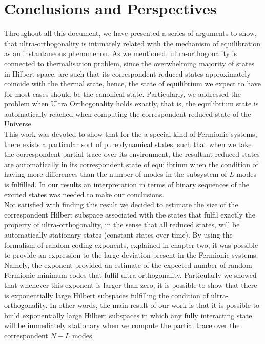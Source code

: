 \chapter{Conclusions and Perspectives}

Throughout all this document, we have presented a series of arguments to show, that ultra-orthogonality is intimately related with the mechanism of equilibration as an instantaneous phenomenon.  As we mentioned, ultra-orthogonality is connected to thermalisation problem, since the overwhelming  majority of states in Hilbert space, are such that its correspondent reduced states approximately coincide with the thermal state, hence, the state of equilibrium we expect to have for most cases should be the canonical state. Particularly, we addressed the problem when Ultra Orthogonality holds exactly, that is, the equilibrium state is automatically reached when computing the correspondent reduced state of the Universe.\\
\indent This work was  devoted to show that for the a special kind of Fermionic systems, there exists a particular sort of pure dynamical states, such that when we take the correspondent partial trace over its environment, the resultant reduced states are automatically in its correspondent state of equilibrium when the condition of having more differences than the number of modes in the subsystem of $L$ modes is fulfilled. In our results an interpretation in terms of binary sequences of the excited states was needed to make our conclusions.\\
\indent Not satisfied with finding this result we decided to estimate the size of the correspondent Hilbert subspace associated with the states that fulfil exactly the property of ultra-orthogonality, in the sense that all reduced states, will be automatically stationary states (constant states over time). By using the formalism of random-coding exponents, explained in chapter two, it was possible to provide an expression to the large deviation present in the Fermionic systems. Namely, the exponent provided an estimate of the expected number of random Fermionic minimum codes that fulfil ultra-orthogonality. Particularly we showed that whenever this exponent is larger than zero, it is possible to show that there is exponentially large Hilbert subspaces fulfilling the condition of ultra-orthogonality. In other words, the main result of our work is that it is possible to build exponentially large Hilbert subspaces in which any fully interacting state will be immediately stationary when we compute the partial trace over the correspondent $N-L$ modes.\\

